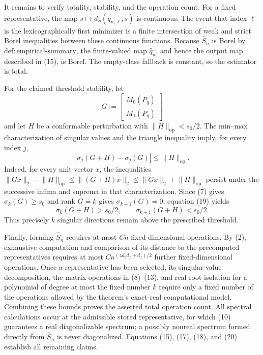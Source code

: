 It remains to verify totality, stability, and the operation count.  For a fixed representative, the map \(s\mapsto d_S(q_{n,\ell},s)\) is continuous.  The event that index \(\ell\) is the lexicographically first minimizer is a finite intersection of weak and strict Borel inequalities between these continuous functions.  Because \(\widehat S_n\) is Borel by \(\mathrm{def:empirical\text{-}summary}\), the finite-valued map \(\widehat q_n\), and hence the output map described in (15), is Borel.  The empty-class fallback is constant, so the estimator is total.

For the claimed threshold stability, let
\[
G:=\begin{bmatrix}M_0(P_q)\\M_1(P_q)\end{bmatrix}
\]
and let \(H\) be a conformable perturbation with \(\lVert H\rVert_{\mathrm{op}}<s_0/2\).  The min--max characterization of singular values and the triangle inequality imply, for every index \(j\),
\[
|\sigma_j(G+H)-\sigma_j(G)|\le\lVert H\rVert_{\mathrm{op}}. \tag{19}
\]
Indeed, for every unit vector \(x\), the inequalities \(\lVert Gx\rVert_2-\lVert H\rVert_{\mathrm{op}}\le\lVert(G+H)x\rVert_2\le\lVert Gx\rVert_2+\lVert H\rVert_{\mathrm{op}}\) persist under the successive infima and suprema in that characterization.  Since (7) gives \(\sigma_k(G)\ge s_0\) and rank \(G=k\) gives \(\sigma_{k+1}(G)=0\), equation (19) yields
\[
\sigma_k(G+H)>s_0/2,
\qquad
\sigma_{k+1}(G+H)<s_0/2. \tag{20}
\]
Thus precisely \(k\) singular directions remain above the prescribed threshold.

Finally, forming \(\widehat S_n\) requires at most \(Cn\) fixed-dimensional operations.  By (2), exhaustive computation and comparison of its distance to the precomputed representatives requires at most \(Cn^{(4d_zd_x+d_x)/2}\) further fixed-dimensional operations.  Once a representative has been selected, its singular-value decomposition, the matrix operations in (8)--(13), and real root isolation for a polynomial of degree at most the fixed number \(k\) require only a fixed number of the operations allowed by the theorem's exact-real computational model.  Combining these bounds proves the asserted total operation count.  All spectral calculations occur at the admissible stored representative, for which (10) guarantees a real diagonalizable spectrum; a possibly nonreal spectrum formed directly from \(\widehat S_n\) is never diagonalized.  Equations (15), (17), (18), and (20) establish all remaining claims.
